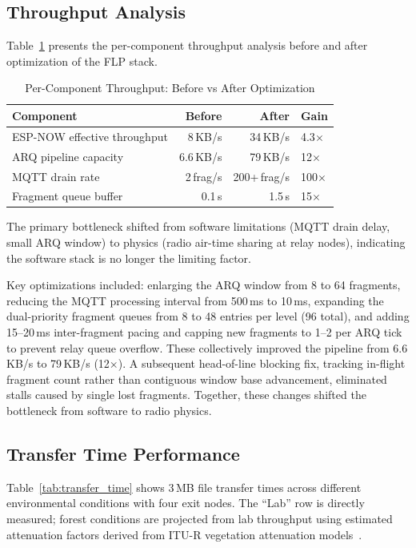 \documentclass[conference]{IEEEtran}
\begin{document}
\subsection{Throughput Analysis}

Table~\ref{tab:throughput} presents the per-component throughput analysis before and after optimization of the FLP stack.

\begin{table}[htbp]
  \centering
  \caption{Per-Component Throughput: Before vs After Optimization}
  \label{tab:throughput}
  \begin{tabular}{@{}lrrl@{}}
    \toprule
    \textbf{Component} & \textbf{Before} & \textbf{After} & \textbf{Gain} \\
    \midrule
    ESP-NOW effective throughput & 8\,KB/s & 34\,KB/s & 4.3$\times$ \\
    ARQ pipeline capacity & 6.6\,KB/s & 79\,KB/s & 12$\times$ \\
    MQTT drain rate & 2\,frag/s & 200+\,frag/s & 100$\times$ \\
    Fragment queue buffer & 0.1\,s & 1.5\,s & 15$\times$ \\
    \bottomrule
  \end{tabular}
\end{table}

The primary bottleneck shifted from software limitations (MQTT drain delay, small ARQ window) to physics (radio air-time sharing at relay nodes), indicating the software stack is no longer the limiting factor.

Key optimizations included: enlarging the ARQ window from 8 to 64 fragments, reducing the MQTT processing interval from 500\,ms to 10\,ms, expanding the dual-priority fragment queues from 8 to 48 entries per level (96 total), and adding 15--20\,ms inter-fragment pacing and capping new fragments to 1--2 per ARQ tick to prevent relay queue overflow. These collectively improved the pipeline from 6.6\,KB/s to 79\,KB/s (12$\times$). A subsequent head-of-line blocking fix, tracking in-flight fragment count rather than contiguous window base advancement, eliminated stalls caused by single lost fragments. Together, these changes shifted the bottleneck from software to radio physics.

\subsection{Transfer Time Performance}

Table~\ref{tab:transfer_time} shows 3\,MB file transfer times across different environmental conditions with four exit nodes. The ``Lab'' row is directly measured; forest conditions are projected from lab throughput using estimated attenuation factors derived from ITU-R vegetation attenuation models~\cite{itur2019vegetation}.
\end{document}
